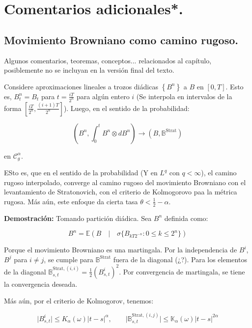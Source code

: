 
\section{Comentarios adicionales*.}

\subsection{Movimiento Browniano como camino rugoso.}

Algunos comentarios, teoremas, conceptos... relacionados al capítulo, posiblemente no se incluyan en la versión final del texto.

\begin{prop}
	Considere aproximaciones lineales a trozos diádicas $\left\{ B^{n} \right\}$ a $B$ en $[0,T]$. Esto es, $B_t^n = B_t$ para $t = \frac{iT}{2^n}$ para algún entero $i$ (Se interpola en intervalos de la forma $\left[ \frac{iT}{2^n}, \frac{(i+1)T}{2^n} \right]$). Luego, en el sentido de la probabilidad:

	\[
		\left( B^n, \int_0^t B^n \otimes dB^n \right) \rightarrow (B, \mathbb{B}^{\text{Strat}})
	\]

	en $\mathcal{C}^{\alpha}_g$.

\end{prop}

ESto es, que en el sentido de la probabilidad (Y en $L^q$ con $q < \infty$), el camino rugoso interpolado, converge al camino rugoso del movimiento Browniano con el levantamiento de Stratonovich, con el criterio de Kolmogorovo paa la métrica rugosa. Más aún, este enfoque da cierta tasa $\theta < \frac{1}{2} - \alpha$. 
 

\textbf{Demostración:} Tomando partición diádica. Sea $B^n$ definida como:

\[
	B^n = \mathbb{E}(B \quad \vert \quad \sigma\{ B_{kT 2^{-n}}  : 0 \leq k \leq 2^n  \})
\]

Porque el movimiento Browniano es una martingala. Por la independencia de $B^i$, $B^j$ para $i \neq j$, se cumple para $\mathbb{B}^{\text{Strat}}$ fuera de la diagonal (¿?). Para los elementos de la diagonal $\mathbb{B}^{\text{Strat}, (i,i)}_{s,t} = \frac{1}{2} (B_{s,t}^i)^2$. Por convergencia de martingala, se tiene la convergencia deseada.

Más aún, por el criterio de Kolmogorov, tenemos:

\[
	\lvert B^i_{s,t} \rvert \leq K_{\alpha} (\omega) \lvert t - s \rvert^{\alpha}, \qquad \lvert \mathbb{B}_{s,t}^{\text{Strat}, (i,j)} \rvert \leq \mathbb{K}_{\alpha} (\omega) \lvert t - s \rvert^{2\alpha}
\]

